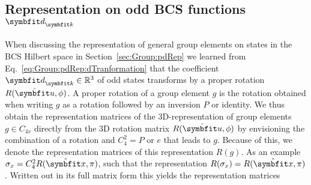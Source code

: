 \subsection{Representation on odd BCS functions $\v{d}_\v{k}$}

When discussing the representation of general group elements on states in the BCS Hilbert space in Section~\ref{sec:Group:pdRep} we learned from
Eq.~\eqref{eq:Group:pdRep:dTranformation} that the coefficient $\v{d}_\v{k}\in\mathbb{R}^3$ of odd states transforms by a proper rotation $R(\hat{\v{u}},\phi)$.
A proper rotation of a group element $g$ is the rotation obtained when writing $g$ as a rotation followed by an inversion $P$ or identity. We thus
obtain the representation matrices of the $3$D-representation of group elements $g\in C_{4v}$ directly from the $3$D rotation matrix $R(\hat{\v{u}},\phi)$ by
envisioning the combination of a rotation and $C_{4}^2=P$ or $e$ that leads to $g$. Because of this, we denote the representation matrices of this
representation $R(g)$. As an example $\sigma_x = C_4^2R(\hat{\v{x}},\pi)$, such that the representation $R(\sigma_x) = R(\hat{\v{x}},\pi)$. Written
out in its full matrix form this yields the representation matrices
%
